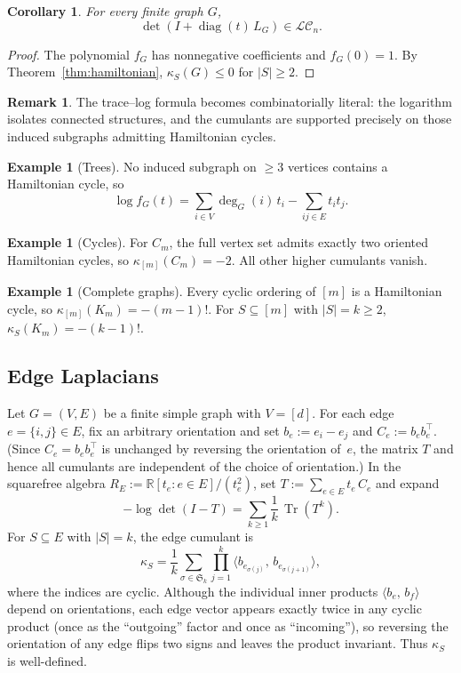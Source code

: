 \documentclass[11pt]{amsart}
\newtheorem{cor}[thm]{Corollary}
\theoremstyle{definition}
\newtheorem{example}[thm]{Example}
\newtheorem{remark}[thm]{Remark}
\newcommand{\R}{\mathbb{R}}
\newcommand{\ip}[2]{\langle #1,\, #2 \rangle}
\DeclareMathOperator{\Tr}{Tr}
\DeclareMathOperator{\diag}{diag}
\begin{document}
\begin{cor}\label{cor:laplacian-LC}
For every finite graph $G$,
\[
  \det(I + \diag(t)\, L_G) \in \mathcal{LC}_n.
\]
\end{cor}

\begin{proof}
The polynomial $f_G$ has nonnegative coefficients and $f_G(0)=1$.  By Theorem~\ref{thm:hamiltonian}, $\kappa_S(G)\le 0$ for $|S|\ge 2$.
\end{proof}

\begin{remark}\label{rem:graph-examples}
The trace--log formula becomes combinatorially literal: the logarithm isolates connected structures, and the cumulants are supported precisely on those induced subgraphs admitting Hamiltonian cycles.
\end{remark}

\begin{example}[Trees]
     No induced subgraph on $\ge 3$ vertices contains a Hamiltonian cycle, so
\[
  \log f_G(t) = \sum_{i\in V}\deg_G(i)\, t_i
  - \sum_{ij\in E} t_i t_j.
\]
\end{example}

\begin{example}[Cycles]
    For $C_m$, the full vertex set admits exactly two oriented Hamiltonian cycles, so $\kappa_{[m]}(C_m) = -2$. All other higher cumulants vanish.
\end{example}

\begin{example}[Complete graphs]  
    Every cyclic ordering of $[m]$ is a Hamiltonian cycle, so $\kappa_{[m]}(K_m) = -(m-1)!$.  For $S\subseteq[m]$ with $|S|=k\ge 2$,\; $\kappa_S(K_m) = -(k-1)!$.
\end{example}

\subsection{Edge Laplacians}
\label{ssec:edge-laplacian}

Let $G=(V,E)$ be a finite simple graph with $V=[d]$.  For each edge $e=\{i,j\}\in E$, fix an arbitrary orientation and set $b_e := e_i - e_j$ and $C_e := b_e b_e^\top$.  (Since $C_e = b_e b_e^\top$ is unchanged by reversing the orientation of~$e$, the matrix $T$ and hence all cumulants are independent of the choice of orientation.)  In the squarefree algebra $R_E := \R[t_e : e\in E]/(t_e^2)$, set $T := \sum_{e\in E} t_e\, C_e$ and expand
\[
  -\log\det(I - T)
  = \sum_{k\ge 1}\frac{1}{k}\,\Tr(T^k).
\]
For $S\subseteq E$ with $|S|=k$, the edge cumulant is
\[
  \kappa_S
  = \frac{1}{k}\sum_{\sigma\in\mathfrak{S}_k}
  \prod_{j=1}^k \ip{b_{e_{\sigma(j)}}}{b_{e_{\sigma(j+1)}}},
\]
where the indices are cyclic.  Although the individual inner products $\ip{b_e}{b_f}$ depend on orientations, each edge vector appears exactly twice in any cyclic product (once as the ``outgoing'' factor and once as ``incoming''), so reversing the orientation of any edge flips two signs and leaves the product invariant.  Thus $\kappa_S$ is well-defined.
\end{document}
